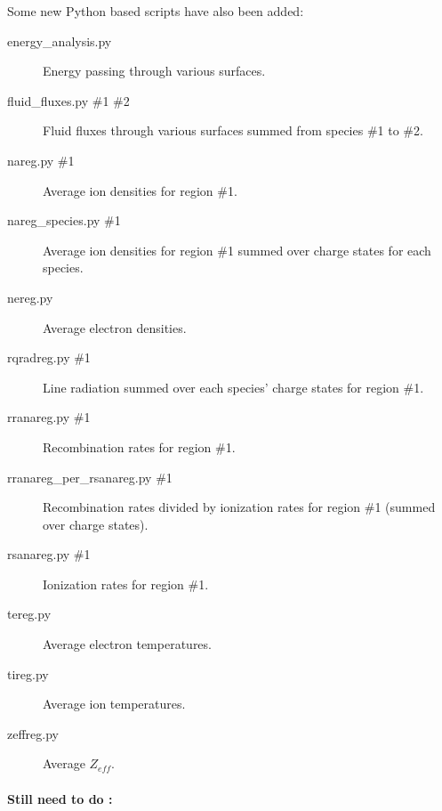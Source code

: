 \documentclass[a4paper,10pt]{report}
\begin{document}
Some new Python  based scripts have also been added:
\begin{description}
  \item[energy\_analysis.py] Energy
    passing through various surfaces.
  \item[fluid\_fluxes.py \#1 \#2] Fluid fluxes
    through various surfaces summed from species \#1 to \#2.
  \item[nareg.py \#1] Average ion densities for region \#1.
  \item[nareg\_species.py \#1]  Average ion
    densities for region \#1 summed over charge states for each species.
  \item[nereg.py] Average electron densities.
  \item[rqradreg.py \#1] Line radiation summed over
    each species' charge states for region \#1.
  \item[rranareg.py \#1] Recombination rates for
    region \#1.
  \item[rranareg\_per\_rsanareg.py \#1]\index{[rranareg\_per\_rsanareg.py}
    Recombination rates divided by ionization rates for region \#1
    (summed over charge states).
  \item[rsanareg.py \#1] Ionization rates for
    region \#1.
  \item[tereg.py] Average electron temperatures.
  \item[tireg.py] Average ion temperatures.
  \item[zeffreg.py] Average $Z_{eff}$.
\end{description}

\paragraph{Still need to do :}
\end{document}
